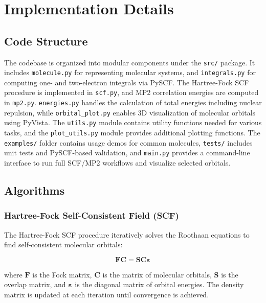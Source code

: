 \documentclass[12pt]{article}
\begin{document}
\section{Implementation Details}

\subsection{Code Structure}

The codebase is organized into modular components under the \texttt{src/} package. It includes \texttt{molecule.py} for representing molecular systems, and \texttt{integrals.py} for computing one- and two-electron integrals via PySCF. The Hartree-Fock SCF procedure is implemented in \texttt{scf.py}, and MP2 correlation energies are computed in \texttt{mp2.py}. \texttt{energies.py} handles the calculation of total energies including nuclear repulsion, while \texttt{orbital\_plot.py} enables 3D visualization of molecular orbitals using PyVista. The \texttt{utils.py} module contains utility functions needed for various tasks, and the \texttt{plot\_utils.py} module provides additional plotting functions. The \texttt{examples/} folder contains usage demos for common molecules, \texttt{tests/} includes unit tests and PySCF-based validation, and \texttt{main.py} provides a command-line interface to run full SCF/MP2 workflows and visualize selected orbitals.

\subsection{Algorithms}

\subsubsection*{Hartree-Fock Self-Consistent Field (SCF)}

The Hartree-Fock SCF procedure iteratively solves the Roothaan equations to find self-consistent molecular orbitals:

\[
\mathbf{F} \mathbf{C} = \mathbf{S} \mathbf{C} \boldsymbol{\varepsilon}
\]

where $\mathbf{F}$ is the Fock matrix, $\mathbf{C}$ is the matrix of molecular orbitals, $\mathbf{S}$ is the overlap matrix, and $\boldsymbol{\varepsilon}$ is the diagonal matrix of orbital energies. The density matrix is updated at each iteration until convergence is achieved.
\end{document}
